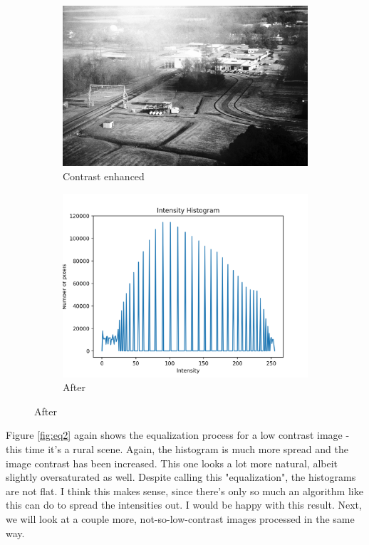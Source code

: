 \documentclass[11pt,a4paper]{article}
\begin{document}
\clearpage

\begin{figure}[ht]
	\ContinuedFloat
	\centering
	\begin{subfigure}[h]{0.7\textwidth}
		\includegraphics[width=\textwidth]{figs/lc2_ce}
		\caption{Contrast enhanced}
		\label{fig:lc2_after}
	\end{subfigure}
	\par\bigskip
	\begin{subfigure}[h]{0.75\textwidth}
		\includegraphics[width=\textwidth]{figs/lc2_hist_aft}
		\caption{After}
		\label{fig:hist_aft_2}
	\end{subfigure}
\end{figure}

Figure \ref{fig:eq2} again shows the equalization process for a low contrast image - this time it's a rural scene. Again, the histogram is much more spread and the image contrast has been increased. This one looks a lot more natural, albeit slightly oversaturated as well. 
Despite calling this "equalization", the histograms are not flat. I think this makes sense, since there's only so much an algorithm like this can do to spread the intensities out. I would be happy with this result. Next, we will look at a couple more, not-so-low-contrast images processed in the same way.
\end{document}
